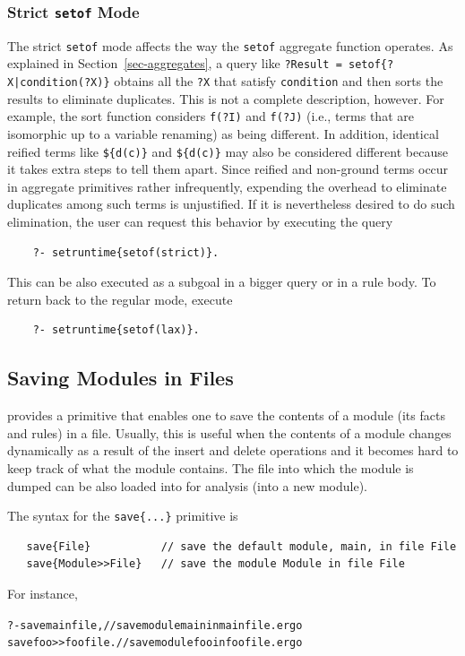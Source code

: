 \documentclass[11pt]{article}
\newcommand{\ERGO}{\mbox{\smaller{\ensuremath{\cal{E}}\smaller{{\sc{RGO}}}}}\xspace}
\newcommand{\FLSYSTEM}{\ERGO}
\newcommand{\ergoext}{ergo\xspace}
\begin{document}
\subsubsection{Strict \texttt{setof} Mode} \label{sec-strict-setof}

The strict \texttt{setof} mode affects the way the \texttt{setof} aggregate
function operates.  
As explained in Section~\ref{sec-aggregates},
a query like \texttt{?Result = setof\{?X|condition(?X)\}} obtains all the
\texttt{?X} that satisfy \texttt{condition} and then sorts the results to
eliminate duplicates. This is not a complete description, however.
For example, the sort function considers \texttt{f(?I)} and \texttt{f(?J)}
(i.e., terms that are isomorphic up to a variable renaming) as being
different. In addition, identical reified terms like \texttt{\$\{d(c)\}} and
\texttt{\$\{d(c)\}} may also be considered different because it takes  extra
steps to tell them apart. Since reified and non-ground
terms occur in aggregate primitives
rather infrequently, expending the overhead to eliminate duplicates among
such terms is unjustified. If it is nevertheless desired to do such
elimination, the user can request this behavior by executing the query
\begin{verbatim}
    ?- setruntime{setof(strict)}.
\end{verbatim}
This can be also executed as a subgoal in a bigger query or in a rule body.
To return back to the regular mode, execute
\begin{verbatim}
    ?- setruntime{setof(lax)}.
\end{verbatim}


\subsection{Saving Modules in Files}

\FLSYSTEM provides a primitive that enables one to save the contents of a
module (its facts and rules) in a file. Usually, this is useful when the
contents of a module changes dynamically as a result of the insert and
delete operations and it becomes hard to keep track of what the module
contains.  The file into which the module is dumped can be also loaded into
\FLSYSTEM for analysis (into a new module).

The syntax for the \texttt{save\{...\}}  primitive is 
\begin{verbatim}
   save{File}           // save the default module, main, in file File
   save{Module>>File}   // save the module Module in file File
\end{verbatim}
For instance,
\begin{alltt}
    ?- save{mainfile},     // save module main in mainfile.\ergoext
       save{foo>>foofile}. // save module foo in foofile.\ergoext
\end{alltt}
\end{document}
